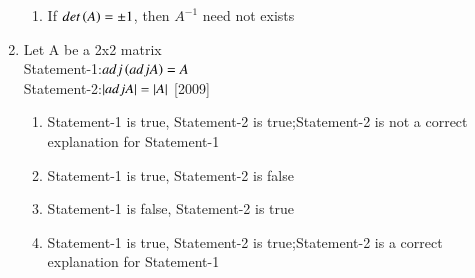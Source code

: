 \documentclass[journal]{IEEEtran}
\numberwithin{equation}{enumi}
\numberwithin{figure}{enumi}
\begin{document}
\begin{enumerate}
\begin{enumerate}
			\item If $det\left(A\right)=\pm1$, then $A^{-1}$ need not exists
		\end{enumerate}
	\item Let A be a 2x2 matrix \\
		Statement-1:$adj\left(adjA\right) = A$ \\
		Statement-2:$\left\vert adjA\right\vert = \left\vert A\right\vert$ \hfill{[2009]}
		\begin{enumerate}
			\item Statement-1 is true, Statement-2 is true;Statement-2 is not a correct explanation for Statement-1
			\item Statement-1 is true, Statement-2 is false
			\item Statement-1 is false, Statement-2 is true
			\item Statement-1 is true, Statement-2 is true;Statement-2 is a correct explanation for Statement-1
		\end{enumerate}

\end{enumerate}
\end{document}

